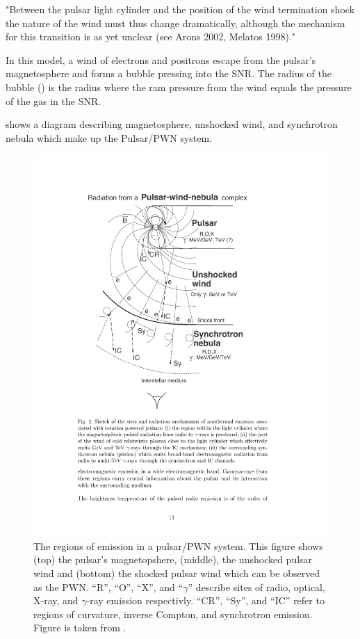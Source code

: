 "Between the pulsar light cylinder and the position of the wind
termination shock the nature of the wind must thus change dramatically,
although the mechanism for this transition is as yet unclear (see Arons
2002, Melatos 1998)."


In this model, a wind of electrons and positrons escape from
the pulsar's magnetosphere and forms a bubble pressing into the
\ac{SNR}. The radius of the bubble (\radiusterminationshock) is the
radius where the ram pressure from the wind equals the pressure of the
gas in the \ac{SNR}. 

 shows a
diagram describing magnetosphere, unshocked wind, and synchrotron
nebula which make up the Pulsar/\ac{PWN} system.

\begin{figure}[htpb]
  \begin{center}
    \includegraphics{chapters/introduction/figures/termination_shock.pdf}
  \end{center}
  \caption{The regions of emission in a pulsar/\ac{PWN} system. 
  This figure shows (top) the pulsar's magnetopshere, (middle), the
  unshocked pulsar wind and (bottom) the shocked pulsar wind which can
  be observed as the \ac{PWN}.
  ``R'', ``O'', ``X'', and ``$\gamma$'' describe sites of radio, optical, X-ray, and
  $\gamma$-ray emission respectivly.
  ``CR'', ``Sy'', and ``IC'' refer to regions of curvature, inverse Compton, and
  synchrotron emission.
  Figure is taken from \cite{aharonian_2003_exploring-physics}.
  }
\end{figure}

